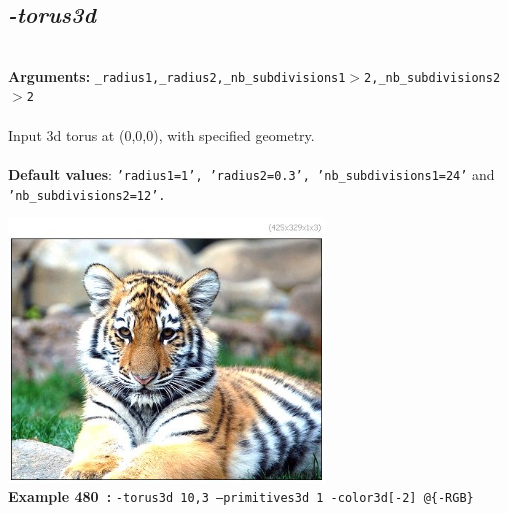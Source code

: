 \documentclass[a4paper,11pt,twoside]{book}
\begin{document}
\subsection{\emph{-torus3d} }\vspace*{-0.5em}
~\\\textbf{Arguments: } 
{\small \texttt{\_radius1,\_radius2,\_nb\_subdivisions1$>$2,\_nb\_subdivisions2$>$2}}\\~\\
Input 3d torus at (0,0,0), with specified geometry.
~\\~\\\textbf{Default values}: {\small \texttt{'radius1=1', 'radius2=0.3', 'nb\_subdivisions1=24'} and \texttt{'nb\_subdivisions2=12'.}}
\begin{center}\includegraphics[keepaspectratio=true,height=7cm,width=\textwidth]{img/gmic_def480.jpg}\\
{\footnotesize \textbf{Example 480~:} \texttt{-torus3d 10,3 --primitives3d 1 -color3d[-2] @\{-RGB\}}}
\end{center}
\end{document}
